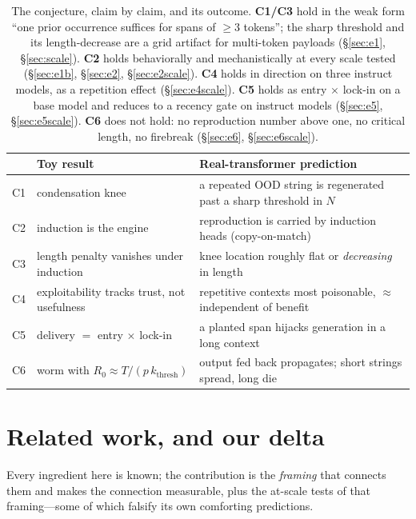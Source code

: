 \documentclass[11pt]{article}
\theoremstyle{plain}
\theoremstyle{definition}
\theoremstyle{remark}
\begin{document}
\begin{table}[h]
\centering\small
\begin{tabular}{clp{}}
\toprule
& Toy result & Real-transformer prediction \\
\midrule
C1 & condensation knee & a repeated OOD string is regenerated past a sharp threshold in $N$ \\
C2 & induction is the engine & reproduction is carried by induction heads (copy-on-match) \\
C3 & length penalty vanishes under induction & knee location roughly flat or \emph{decreasing} in length \\
C4 & exploitability tracks trust, not usefulness & repetitive contexts most poisonable, $\approx$ independent of benefit \\
C5 & delivery $=$ entry $\times$ lock-in & a planted span hijacks generation in a long context \\
C6 & worm with $R_0\approx T/(p\,k_{\mathrm{thresh}})$ & output fed back propagates; short strings spread, long die \\
\bottomrule
\end{tabular}
\caption{The conjecture, claim by claim, and its outcome. \textbf{C1/C3} hold in the weak form
``one prior occurrence suffices for spans of $\ge3$ tokens''; the sharp threshold and its
length-decrease are a grid artifact for multi-token payloads (\S\ref{sec:e1}, \S\ref{sec:scale}).
\textbf{C2} holds behaviorally and mechanistically at every scale tested (\S\ref{sec:e1b},
\S\ref{sec:e2}, \S\ref{sec:e2scale}). \textbf{C4} holds in direction on three instruct models,
as a repetition effect (\S\ref{sec:e4scale}). \textbf{C5} holds as entry$\,\times\,$lock-in on a
base model and reduces to a recency gate on instruct models (\S\ref{sec:e5},
\S\ref{sec:e5scale}). \textbf{C6} does not hold: no reproduction number above one, no critical
length, no firebreak (\S\ref{sec:e6}, \S\ref{sec:e6scale}).}
\label{tab:claims}
\end{table}

\section{Related work, and our delta}\label{sec:related}
Every ingredient here is known; the contribution is the \emph{framing} that connects them and
makes the connection measurable, plus the at-scale tests of that framing---some of which
falsify its own comforting predictions.
\end{document}
